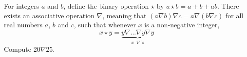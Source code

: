 For integers $a$ and $b$, define the binary operation $\star$ by $a\star b = a + b + ab$. There exists an associative operation $\nabla$, meaning that $(a\nabla b)\nabla c = a\nabla (b\nabla c)$ for all real numbers $a$, $b$ and $c$, such that whenever $x$ is a non-negative integer, \[x\star y = \underbrace{y\nabla ...\nabla y \nabla y}_{x \,\,\, \nabla's}\]Compute $20\nabla 25$.

